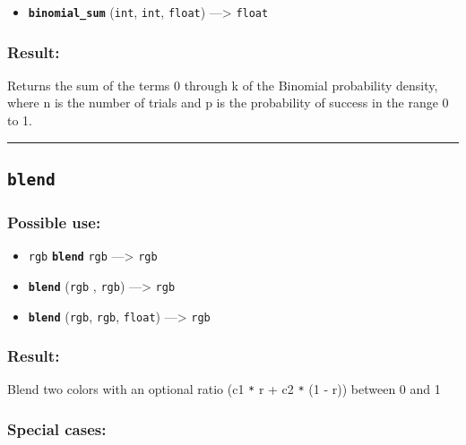 \documentclass[]{book}
\providecommand{\tightlist}{%
  \setlength{\itemsep}{0pt}\setlength{\parskip}{0pt}}
\theoremstyle{definition}
\theoremstyle{definition}
\theoremstyle{definition}
\theoremstyle{remark}
\begin{document}
\begin{itemize}
\tightlist
\item
  \textbf{\texttt{binomial\_sum}} (\texttt{int}, \texttt{int},
  \texttt{float}) ---\textgreater{} \texttt{float}
\end{itemize}

\subsubsection{Result:}\label{result-72}

Returns the sum of the terms 0 through k of the Binomial probability
density, where n is the number of trials and p is the probability of
success in the range 0 to 1.

\begin{center}\rule{0.5\linewidth}{\linethickness}\end{center}

\subsection{\texorpdfstring{\texttt{blend}}{blend}}\label{blend}

\subsubsection{Possible use:}\label{possible-use-74}

\begin{itemize}
\tightlist
\item
  \texttt{rgb} \textbf{\texttt{blend}} \texttt{rgb} ---\textgreater{}
  \texttt{rgb}
\item
  \textbf{\texttt{blend}} (\texttt{rgb} , \texttt{rgb})
  ---\textgreater{} \texttt{rgb}
\item
  \textbf{\texttt{blend}} (\texttt{rgb}, \texttt{rgb}, \texttt{float})
  ---\textgreater{} \texttt{rgb}
\end{itemize}

\subsubsection{Result:}\label{result-73}

Blend two colors with an optional ratio (c1 \texttt{*} r + c2 \texttt{*}
(1 - r)) between 0 and 1

\subsubsection{Special cases:}\label{special-cases-25}
\end{document}
